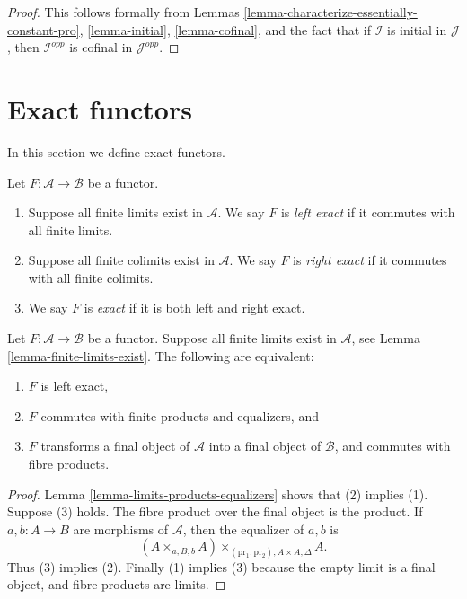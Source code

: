 \begin{proof}
This follows formally from
Lemmas \ref{lemma-characterize-essentially-constant-pro},
\ref{lemma-initial}, \ref{lemma-cofinal}, and
the fact that if $\mathcal{I}$ is initial in $\mathcal{J}$,
then $\mathcal{I}^{opp}$ is cofinal in $\mathcal{J}^{opp}$.
\end{proof}





\section{Exact functors}
\label{section-exact-functor}

\noindent
In this section we define exact functors.

\begin{definition}
\label{definition-exact}
Let $F : \mathcal{A} \to \mathcal{B}$ be a functor.
\begin{enumerate}
\item Suppose all finite limits exist in $\mathcal{A}$.
We say $F$ is {\it left exact} if it commutes
with all finite limits.
\item Suppose all finite colimits exist in $\mathcal{A}$.
We say $F$ is {\it right exact} if it commutes
with all finite colimits.
\item We say $F$ is {\it exact} if it is both left and right
exact.
\end{enumerate}
\end{definition}

\begin{lemma}
\label{lemma-characterize-left-exact}
Let $F : \mathcal{A} \to \mathcal{B}$ be a functor.
Suppose all finite limits exist in $\mathcal{A}$,
see Lemma \ref{lemma-finite-limits-exist}.
The following are equivalent:
\begin{enumerate}
\item $F$ is left exact,
\item $F$ commutes with finite products and equalizers, and
\item $F$ transforms a final object of $\mathcal{A}$
into a final object of $\mathcal{B}$, and commutes with fibre products.
\end{enumerate}
\end{lemma}

\begin{proof}
Lemma \ref{lemma-limits-products-equalizers} shows that (2) implies (1).
Suppose (3) holds. The fibre product over the final object is the product.
If $a, b : A \to B$ are morphisms of $\mathcal{A}$, then the
equalizer of $a, b$ is
$$
(A \times_{a, B, b} A)\times_{(\text{pr}_1, \text{pr}_2), A \times A, \Delta} A.
$$
Thus (3) implies (2). Finally (1) implies (3) because
the empty limit is a final object, and fibre products are limits.
\end{proof}

